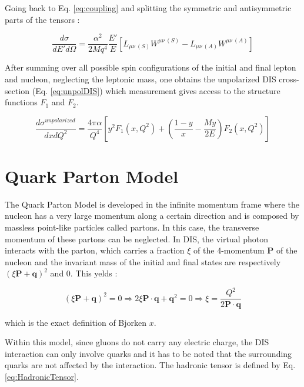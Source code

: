 Going back to Eq. \ref{eq:coupling} and splitting the symmetric and antisymmetric parts of the tensors :

\begin{equation}
  \frac{d\sigma}{dE'd\Omega} = \frac{\alpha^2}{2Mq^4}\frac{E'}{E}\left[L_{\mu\nu\ (S)}W^{\mu\nu\ (S)}-L_{\mu\nu\ (A)}W^{\mu\nu\ (A)}\right]
\end{equation}

After summing over all possible spin configurations of the initial and final lepton and nucleon, neglecting
the leptonic mass, one obtains the unpolarized DIS cross-section (Eq. \ref{eq:unpolDIS}) which measurement gives access
to the structure functions $F_1$ and $F_2$.

\begin{equation}
  \frac{d\sigma^{unpolarized}}{dxdQ^2} = \frac{4\pi\alpha}{Q^4}\left[y^2F_1(x,Q^2)+\left(\frac{1-y}{x}-\frac{My}{2E}\right)F_2(x,Q^2)\right]
  \label{eq:unpolDIS}
\end{equation}


\section{Quark Parton Model}

The Quark Parton Model is developed in the infinite momentum frame where the nucleon has a very large momentum
along a certain direction and is composed by massless point-like particles called partons. In this case, the
transverse momentum of these partons can be neglected. In DIS, the virtual photon interacts with the parton,
which carries a fraction $\xi$ of the 4-momentum \textbf{P} of the nucleon and the invariant mass of the initial
and final states are respectively $(\xi\textbf{P}+\textbf{q})^2$ and 0. This yelds :

\begin{equation}
  (\xi\textbf{P}+\textbf{q})^2 = 0 \Rightarrow 2\xi\textbf{P}\cdot\textbf{q}+\textbf{q}^2 = 0 \Rightarrow \xi = \frac{Q^2}{2\textbf{P}\cdot\textbf{q}}
\end{equation}

which is the exact definition of Bjorken $x$.

Within this model, since gluons do not carry any electric charge, the DIS interaction can only involve quarks and
it has to be noted that the surrounding quarks are not affected by the interaction. The hadronic tensor is defined
by Eq. \ref{eq:HadronicTensor}.

